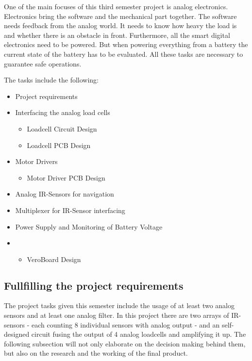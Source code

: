 \documentclass[../report.tex]{subfiles}
\begin{document}
One of the main focuses of this third semester project is analog electronics. Electronics bring the software and the mechanical part together. 
The software needs feedback from the analog world. It needs to know how heavy the load is and
whether there is an obstacle in front. Furthermore, all the smart digital electronics need to be powered. 
But when powering everything from a battery the current state of the battery has to be evaluated.
All these tasks are necessary to guarantee safe operations.

\quad
The tasks include the following:

\begin{itemize}
    \item Project requirements 
    \item Interfacing the analog load cells
    \begin{itemize}
      \item Loadcell Circuit Design
      \item Loadcell PCB Design
    \end{itemize} 
    \item Motor Drivers
    \begin{itemize}
      \item Motor Driver PCB Design
    \end{itemize}  
    \item Analog IR-Sensors for navigation
    \item Multiplexer for IR-Sensor interfacing
    \item Power Supply and Monitoring of Battery Voltage
    \item \begin{itemize}
      \item VeroBoard Design
    \end{itemize}
\end{itemize}

\subsection{Fullfilling the project requirements}
The project tasks given this semester include the usage of at least two analog sensors
and at least one analog filter. In this project there are two arrays of
IR-sensors - each counting 8 individual sensors with analog output - and 
an self-designed circuit fusing the output of 4 analog loadcells and amplifying 
it up. The following subsection will not only elaborate on the decision making
behind them, but also on the research and the working of the final product. 
  
\end{document}
